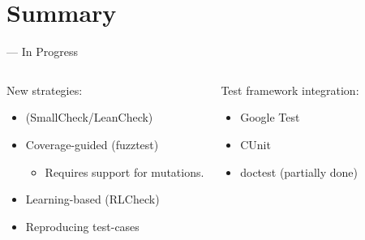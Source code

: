 \section{Summary}

\begin{frame}{\halcheck{} --- In Progress}
  \begin{columns}[T,onlytextwidth]
    \begin{block}{New strategies:}
      \begin{itemize}
        \item {} (SmallCheck/LeanCheck)
        \item Coverage-guided (fuzztest)
        \begin{itemize}
          \item Requires support for \alert{mutations}.
        \end{itemize}
        \item Learning-based (RLCheck)
        \item Reproducing test-cases
      \end{itemize}
    \end{block}

    \begin{block}{Test framework integration:}
      \begin{itemize}
        \item Google Test
        \item CUnit
        \item doctest (partially done)
      \end{itemize}
    \end{block}
  \end{columns}
\end{frame}

